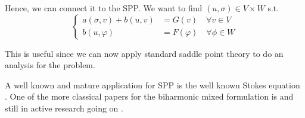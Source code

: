 Hence, we can connect it to the SPP. We want to find $( u,\sigma ) \in V \times W$ s.t.  \[
    \begin{cases}
       a( \sigma ,v) + b ( u, v )  & = G( v)   \quad  \forall v \in V \\
       b( u, \varphi  )  & = F( \varphi )     \quad \forall \phi \in W
    \end{cases}
\]

This is useful since we can now apply standard saddle point theory to do an analysis for the problem.

A well known and mature application for SPP is the well known Stokes equation \cite{john2016finite, knabner2003numerical}. One of the more classical papers for the biharmonic mixed formulation is and still in active
research going on \cite{babuvska1980analysis,cai2023nitsche}.






